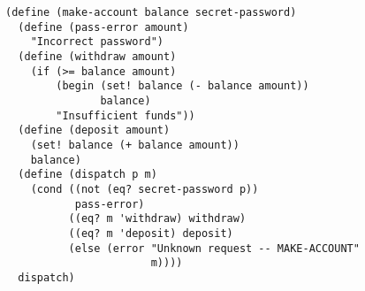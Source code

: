 \documentclass[a4paper,12pt]{article}
\begin{document}
\begin{lstlisting}
(define (make-account balance secret-password)
  (define (pass-error amount)
    "Incorrect password")
  (define (withdraw amount)
    (if (>= balance amount)
        (begin (set! balance (- balance amount))
               balance)
        "Insufficient funds"))
  (define (deposit amount)
    (set! balance (+ balance amount))
    balance)
  (define (dispatch p m)
    (cond ((not (eq? secret-password p))
           pass-error)
          ((eq? m 'withdraw) withdraw)
          ((eq? m 'deposit) deposit)
          (else (error "Unknown request -- MAKE-ACCOUNT"
                       m))))
  dispatch)
\end{lstlisting}
\end{document}
